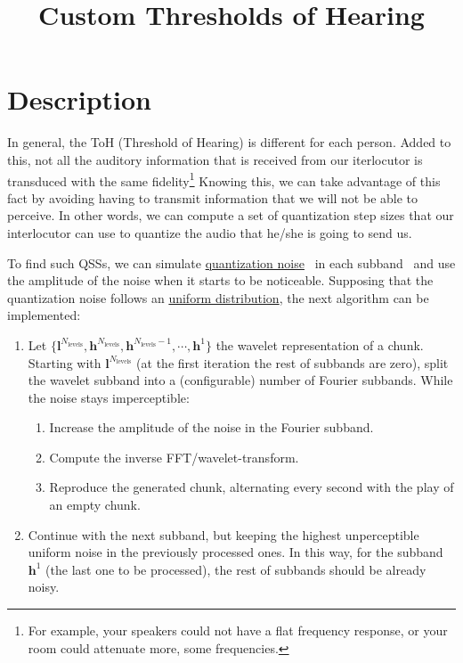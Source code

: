
\title{Custom Thresholds of Hearing}

\maketitle

\section{Description}
In general, the ToH (Threshold of Hearing) is different for each
person. Added to this, not all the auditory information that is
received from our iterlocutor is transduced with the same
fidelity\footnote{For example, your speakers could not have a flat
  frequency response, or your room could attenuate more, some
  frequencies.} Knowing this, we can take advantage of this fact by
avoiding having to transmit information that we will not be able to
perceive. In other words, we can compute a set of quantization step
sizes that our interlocutor can use to quantize the audio that he/she
is going to send us.

To find such QSSs, we can simulate
\href{https://en.wikipedia.org/wiki/Quantization_(signal_processing)}{quantization
  noise}~\cite{sayood2017introduction} in each
subband~\cite{vetterli1995wavelets} and use the amplitude of the noise
when it starts to be noticeable. Supposing that the quantization noise
follows an
\href{https://en.wikipedia.org/wiki/Continuous_uniform_distribution}{uniform
  distribution}, the next algorithm can be implemented:

\begin{enumerate}
\item Let
  $\{{\mathbf l}^{N_{\text{levels}}}, {\mathbf h}^{N_{\text{levels}}},
  {\mathbf h}^{N_{\text{levels}}-1},\cdots, {\mathbf h}^1\}$ the
  wavelet representation of a
  chunk. %
  Starting with ${\mathbf l}^{N_{\text{levels}}}$ (at the first
  iteration the rest of subbands are zero), split the wavelet subband
  into a (configurable) number of Fourier subbands. While the noise stays
  imperceptible:
  \begin{enumerate}
  \item Increase the amplitude of the noise in the Fourier subband.
  \item Compute the inverse FFT/wavelet-transform.
  \item Reproduce the generated chunk, alternating every second with
    the play of an empty chunk.
  \end{enumerate}
\item Continue with the next subband, but keeping the
  highest unperceptible uniform noise in the previously processed
  ones. In this way, for the subband ${\mathbf h}^1$ (the last
  one to be processed), the rest of subbands should be already
  noisy.
\end{enumerate}


